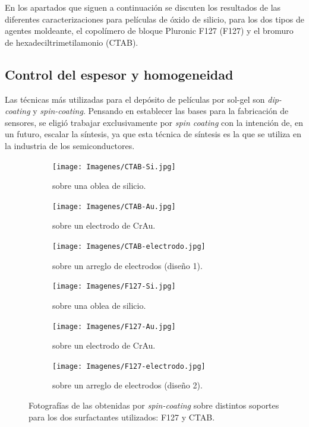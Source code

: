 	En los apartados que siguen a continuación se discuten los resultados de las diferentes caracterizaciones para películas de óxido de silicio, para los dos tipos de agentes moldeante, el copolímero de bloque Pluronic F127 (F127) y el bromuro de hexadeciltrimetilamonio (CTAB). 

	\subsection{Control del espesor y homogeneidad}
		
		Las técnicas más utilizadas para el depósito de películas por sol-gel son \textit{dip-coating} y \textit{spin-coating}. 
		Pensando en establecer las bases para la fabricación de sensores, se eligió trabajar exclusivamente por \textit{spin coating} con la intención de, en un futuro, escalar la síntesis, ya que esta técnica de síntesis es la que se utiliza en la industria de los semiconductores.\cite{Franssila2004,Jaeger2001}  	   	
			\begin{figure}[th]
	 	   	    \begin{subfigure}[t]{0.325\textwidth}
		        	\texttt{[image: Imagenes/CTAB-Si.jpg]}
		       		\caption{\pdmC\space sobre una oblea de silicio.}
		         	\label{fig:F127_vidrio}
		     		\end{subfigure}
	     		\begin{subfigure}[t]{0.325\textwidth}
		        	\texttt{[image: Imagenes/CTAB-Au.jpg]}
		       		\caption{\pdmC\space sobre un electrodo de Cr\textbar Au.}
		         	\label{fig:F127_silicio}
		     		\end{subfigure}
	     		\begin{subfigure}[t]{0.325\textwidth}
		        	\texttt{[image: Imagenes/CTAB-electrodo.jpg]}
		       		\caption{\pdmC\space sobre un arreglo de electrodos (diseño 1).}
		         	\label{fig:F127_Au}
		     		\end{subfigure}
	 	   	    \begin{subfigure}[t]{0.325\textwidth}
		        	\texttt{[image: Imagenes/F127-Si.jpg]}
		       		\caption{\pdmF\space sobre una oblea de silicio.}
		         	\label{fig:CTAB_vidrio}
		     		\end{subfigure}
	     		\begin{subfigure}[t]{0.325\textwidth}
		        	\texttt{[image: Imagenes/F127-Au.jpg]}
		       		\caption{\pdmF\space sobre un electrodo de Cr\textbar Au.}
		         	\label{fig:CTAB_silicio}
		     		\end{subfigure}
	     		\begin{subfigure}[t]{0.325\textwidth}
		        	\texttt{[image: Imagenes/F127-electrodo.jpg]}
		       		\caption{\pdmF\space sobre un arreglo de electrodos (diseño 2).}
		         	\label{fig:CTAB_Au}
		     		\end{subfigure}
	     		\caption[Películas mesoporosas sobre distintos soportes.]{Fotografías de las \pdm\space obtenidas por \textit{spin-coating }sobre distintos soportes para los dos surfactantes utilizados: F127 y CTAB.}
	     		\label{fig:fotos_films}
	     	   	\end{figure}
